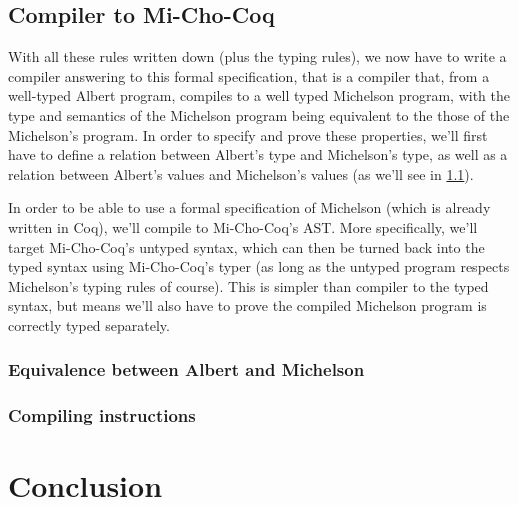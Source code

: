 \documentclass{report}
\begin{document}
\section{Compiler to Mi-Cho-Coq}

With all these rules written down (plus the typing rules), we now have to write a compiler answering to this formal specification, that is a compiler that, from a well-typed Albert program, compiles to a well typed Michelson program, with the type and semantics of the Michelson program being equivalent to the those of the Michelson's program. In order to specify and prove these properties, we'll first have to define a relation between Albert's type and Michelson's type, as well as a relation between Albert's values and Michelson's values (as we'll see in \ref{alberteqmichelson}).

In order to be able to use a formal specification of Michelson (which is already written in Coq), we'll compile to Mi-Cho-Coq's AST. More specifically, we'll target Mi-Cho-Coq's untyped syntax, which can then be turned back into the typed syntax using Mi-Cho-Coq's typer (as long as the untyped program respects Michelson's typing rules of course). This is simpler than compiler to the typed syntax, but means we'll also have to prove the compiled Michelson program is correctly typed separately.

\subsection{Equivalence between Albert and Michelson}
\label{alberteqmichelson}

\subsection{Compiling instructions}

\chapter*{Conclusion}

{}

\end{document}
